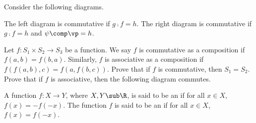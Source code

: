 \documentclass[10pt]{article}
\begin{document}
\begin{example}
    Consider the following diagrams.
    \begin{center}
        \hspace{3cm}
    \end{center}
    The left diagram is commutative if $g\comp f=h$. The right diagram is commutative if $g\comp f=h$ and $\psi\comp\vp=h$.
\end{example}
\begin{problem}
    Let $f:{S}_{1}\times{S}_{2}\to{S}_{3}$ be a function. We say $f$ is commutative as a composition if $f(a,b)=f(b,a)$. Similarly, $f$ is associative as a composition if $f(f(a,b),c)=f(a,f(b,c))$. Prove that if $f$ is commutative, then ${S}_{1}={S}_{2}$. Prove that if $f$ is associative, then the following diagram commutes.
    \begin{center}
    \end{center}
\end{problem}
\begin{definition}
    A function $f:X\to Y$, where $X,Y\sub\R$, is said to be an  if for all $x\in X$, $f(x)=-f(-x)$. The function $f$ is said to be an  if for all $x\in X$, $f(x)=f(-x)$. 
\end{definition}
\end{document}
